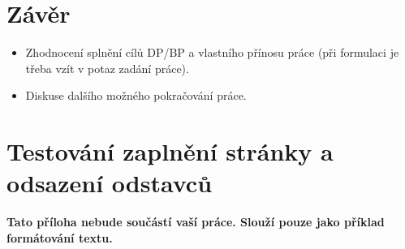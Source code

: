 \documentclass[11pt,twoside,a4paper]{book}
\begin{document}
\chapter{Závěr}

\begin{itemize}
\item Zhodnocení splnění cílů DP/BP a  vlastního přínosu práce (při formulaci je třeba vzít v potaz zadání práce).
\item Diskuse dalšího možného pokračování práce.
\end{itemize} 


%




%
{
\def\CS{$\cal C\kern-0.1667em\lower.5ex\hbox{$\cal S$}\kern-0.075em $}

}

%

\appendix

\chapter{Testování zaplnění stránky a odsazení odstavců}
\textbf{\large Tato příloha nebude součástí vaší práce. 
Slouží pouze jako příklad formátování textu.}
\end{document}
